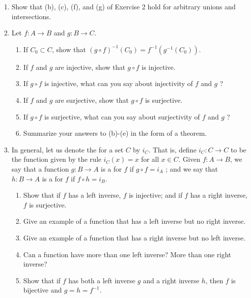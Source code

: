 \begin{enumerate}[itemsep=0.4em, parsep=0pt, topsep=0pt, partopsep=0pt, leftmargin=*, label=\arabic*., ref=\arabic*]
\begin{enumerate}[start=5, itemsep=0.2em, parsep=0pt, topsep=0pt, partopsep=0pt, leftmargin=*, label=(\alph*), align=left]
\end{enumerate}
\item Show that (b), (c), (f), and (g) of Exercise 2 hold for arbitrary unions and intersections.
\item Let \(f : A \rightarrow B\) and \(g : B \rightarrow C\).
  \begin{enumerate}[itemsep=0.2em, parsep=0pt, topsep=0pt, partopsep=0pt, leftmargin=*, label=(\alph*), align=left]
  \item If \(C_{0} \subset C\), show that \({( g \circ f) }^{-1}(C_{0}) = f^{-1}({g^{-1}(C_{0}) })\).
  \item If \(f\) and \(g\) are injective, show that \(g \circ f\) is injective.
  \item If \(g \circ f\) is injective, what can you say about injectivity of \(f\) and \(g\) ?
  \item If \(f\) and \(g\) are surjective, show that \(g \circ f\) is surjective.
  \item If \(g \circ f\) is surjective, what can you say about surjectivity of \(f\) and \(g\) ?
  \item Summarize your answers to (b)-(e) in the form of a theorem.
  \end{enumerate}
\item In general, let us denote the  for a set \(C\) by \(i_{C}\). That is, define \(i_{C} : C \rightarrow C\) to be the function given by the rule \(i_{C}(x) = x\) for all \(x \in C\). Given \(f : A \rightarrow B\), we say that a function \(g : B \rightarrow A\) is a  for \(f\) if \(g \circ f = i_{A}\) ; and we say that \(h : B \rightarrow A\) is a  for \(f\) if \(f \circ h = i_{B}\).
  \begin{enumerate}[itemsep=0.2em, parsep=0pt, topsep=0pt, partopsep=0pt, leftmargin=*, label=(\alph*), align=left]
  \item Show that if \(f\) has a left inverse, \(f\) is injective; and if \(f\) has a right inverse, \(f\) is surjective.
  \item Give an example of a function that has a left inverse but no right inverse.
  \item Give an example of a function that has a right inverse but no left inverse.
  \item Can a function have more than one left inverse? More than one right inverse?
  \item Show that if \(f\) has both a left inverse \(g\) and a right inverse \(h\), then \(f\) is bijective and \(g = h = f^{-1}\).

\end{enumerate}
\end{enumerate}
